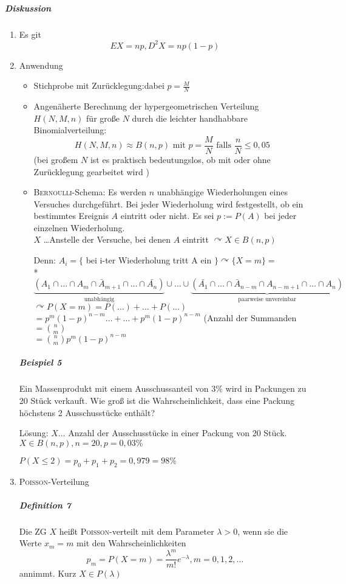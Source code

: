 \documentclass[a4paper]{scrartcl}
\begin{document}
\subparagraph{Diskussion}
\begin{enumerate}
\item Es git
\[ EX = np , D^2 X = np (1-p) \]
\item Anwendung
    \begin{itemize}
    \item Stichprobe mit Zurücklegung:dabei $p= \frac{M}{N}$
    \item Angenäherte Berechnung der hypergeometrischen Verteilung $H(N,M,n)$ für große $N$ durch die leichter handhabbare Binomialverteilung:
    \[ H(N,M,n) \approx B(n,p) \text{ mit } p = \frac{M}{N} \text{ falls } \frac{n}{N} \leq 0,05 \] (bei großem $N$ ist es praktisch bedeutungslos, ob mit oder ohne Zurücklegung gearbeitet wird )
    \item \textsc{Bernoulli}-Schema: Es werden $n$ unabhängige Wiederholungen eines Versuches durchgeführt. Bei jeder Wiederholung wird festgestellt, ob ein bestimmtes Ereignis $A$ eintritt oder nicht. Es sei $p:= P(A)$ bei jeder einzelnen Wiederholung.\\
    $X$ \dots Anstelle der Versuche, bei denen $A$ eintritt $\curvearrowright X \in B (n,p)$
    
    Denn: $A_i = \{$ bei i-ter Wiederholung tritt A ein $\} \curvearrowright \{ X=m \} =$\\* $\underbrace{( A_1 \cap \dots \cap A_m \cap  \bar{A}_{m+1} \cap \dots \cap \bar{A_n})}_{\text{unabhängig}} \cup \dots \cup \underbrace{(\bar{A_1} \cap \dots \cap \bar{A}_{n-m} \cap A_{n-m+1} \cap \dots \cap A_n)}_{\text{paarweise unvereinbar}}$\\
    $\curvearrowright P(X=m) = P(\dots) + \dots + P(\dots)$\\
    $= p^m (1-p)^{n-m} \dots + \dots + p^m (1-p)^{n-m}$ (Anzahl der Summanden $= \binom{n}{m}$\\
    $= \binom{n}{m} p^m (1-p)^{n-m}$
    \end{itemize}
    
\subparagraph{Beispiel 5} Ein Massenprodukt mit einem Ausschussanteil von $3\%$ wird in Packungen zu 20 Stück verkauft. Wie groß ist die Wahrscheinlichkeit, dass eine Packung höchstens 2 Ausschusstücke enthält?

Lösung: $X \dots$ Anzahl der Ausschusstücke in einer Packung von 20 Stück. $X \in B(n,p), n=20, p=0,03 \%$

$P(X \leq 2) = p_0 + p_1 + p_2 = 0,979 = 98 \%$

\item \textsc{Poisson}-Verteilung
\subparagraph{Definition 7} Die ZG $X$ heißt \textsc{Poisson}-verteilt mit dem Parameter $\lambda > 0$, wenn sie die Werte $x_m = m$ mit den Wahrscheinlichkeiten
\[ p_m = P(X = m) = \frac{\lambda^m}{m!} e^{-\lambda}, m = 0,1,2,\dots\] annimmt. Kurz $X \in P(\lambda)$


\end{enumerate}
\end{document}
